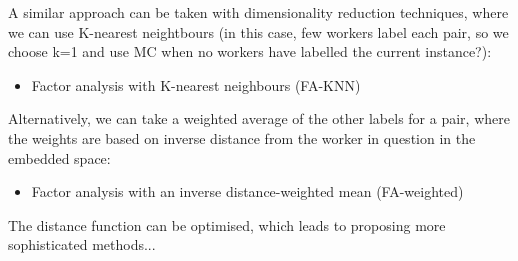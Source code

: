 A similar approach can be taken with dimensionality reduction techniques, where we can use K-nearest neightbours (in this case, few workers label each pair, so we choose k=1 and use MC when no workers have labelled the current instance?):
\begin{itemize}
   \item Factor analysis with K-nearest neighbours (FA-KNN)
\end{itemize}
Alternatively, we can take a weighted average of the other labels for a pair, where the weights are based on inverse distance from the worker in question in the embedded space:
\begin{itemize}
   \item Factor analysis with an inverse distance-weighted mean (FA-weighted)
\end{itemize}
The distance function can be optimised, which leads to proposing more sophisticated methods...